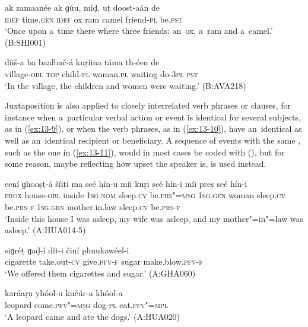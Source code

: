 \ex
\label{ex:13-7}
\gll ak zamaanée {\ob}ak ɡúu, miḍ, uṭ{\cb} doost-aán de \\
\textsc{idef} time.\textsc{gen} \textsc{ idef} ox ram camel friend-\textsc{pl}  be.\textsc{pst}  \\
\glt `Once upon a~time there where three friends: an~ox, a~ram and a~camel.' (B:SHI001)

\ex
\label{ex:13-8}
\gll díiš-a ba {\ob}baalbač-á kuṛíina{\cb} táma th-éen de \\
village-\textsc{obl} \textsc{top} child-\textsc{pl} woman.\textsc{pl} waiting do-\textsc{3pl} \textsc{pst}  \\
\glt `In the village, the children and women were waiting.' (B:AVA218) 
\z

Juxtaposition is also applied to closely interrelated verb phrases or clauses, for instance when a~particular verbal action or event is identical for several subjects, as in (\ref{ex:13-9}), or when the verb phrases, as in (\ref{ex:13-10}), have an~identical  as well as an~identical recipient or beneficiary. A sequence of events with the same , such as the one in (\ref{ex:13-11}), would in most cases be coded with  (), but for some reason, maybe reflecting how upset the speaker is,  is used instead.

\ea
\label{ex:13-9}
\gll eení ɡhooṣṭ-á šíiṭi {\ob}ma seé hín-u míi kuṛi seé hín-i míi preṣ seé hín-i{\cb}\\
\textsc{prox} house-\textsc{obl} inside \textsc{1sg.nom} sleep.\textsc{cv} be.\textsc{prs"=msg}  \textsc{1sg.gen} woman sleep.\textsc{cv} be.\textsc{prs-f } \textsc{1sg.gen} mother.in.law sleep.\textsc{cv} be.\textsc{prs-f} \\
\glt `Inside this house I was asleep, my wife was asleep, and my mother"=in"=law was asleep.' (A:HUA014-5)

\ex
\label{ex:13-10}
\gll siɡréṭ ɡaḍ-í dít-i činí phuukawéel-i\\
cigarette take.out-\textsc{cv} give.\textsc{pfv-f} sugar make.blow.\textsc{pfv-f} \\
\glt `We offered them cigarettes and sugar.' (A:GHA060)

\ex
\label{ex:13-11}
\gll karáaṛu yhóol-u kučúr-a khóol-a  \\
leopard come.\textsc{pfv"=msg} dog-\textsc{pl} eat.\textsc{pfv"=mpl} \\
\glt `A leopard came and ate the dogs.' (A:HUA020) 
\z


